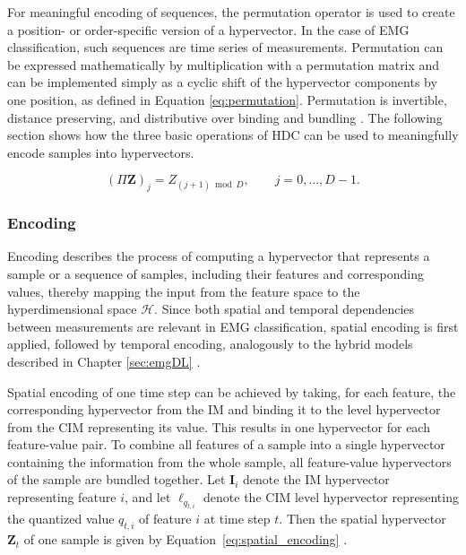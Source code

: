     For meaningful encoding of sequences, the permutation operator is used to create a position- or order-specific version of a hypervector. In the case of EMG classification, such sequences are time series of measurements. Permutation can be expressed mathematically by multiplication with a permutation matrix and can be implemented simply as a cyclic shift of the hypervector components by one position, as defined in Equation \ref{eq:permutation}. Permutation is invertible, distance preserving, and distributive over binding and bundling \cite{kanerva_hyperdimensional_2009}. The following section shows how the three basic operations of HDC can be used to meaningfully encode samples into hypervectors. 
    
        \begin{equation}
            (\Pi \mathbf{Z})_j
            =
            Z_{(j+1)\bmod D},
            \qquad
            j = 0,\ldots,D-1.
            \label{eq:permutation}
        \end{equation}
        
    \subsubsection{Encoding}
    \label{sec:Encoding}
    Encoding describes the process of computing a hypervector that represents a sample or a sequence of samples, including their features and corresponding values, thereby mapping the input from the feature space to the hyperdimensional space $\mathcal{H}$. Since both spatial and temporal dependencies between measurements are relevant in EMG classification, spatial encoding is first applied, followed by temporal encoding, analogously to the hybrid models described in Chapter \ref{sec:emgDL} \cite{rahimi_hyperdimensional_2016}.

    Spatial encoding of one time step can be achieved by taking, for each feature, the corresponding hypervector from the \ac{IM} and binding it to the level hypervector from the \ac{CIM} representing its value. This results in one hypervector for each feature-value pair. To combine all features of a sample into a single hypervector containing the information from the whole sample, all feature-value hypervectors of the sample are bundled together. Let $\mathbf{I}_i$ denote the IM hypervector representing feature $i$, and let $\boldsymbol{\ell}_{q_{t,i}}$ denote the CIM level hypervector representing the quantized value $q_{t,i}$ of feature $i$ at time step $t$. Then the spatial hypervector $\mathbf{Z}_t$ of one sample is given by Equation~\ref{eq:spatial_encoding} \cite{thomas_theoretical_2021,rahimi_hyperdimensional_2016}.
        
